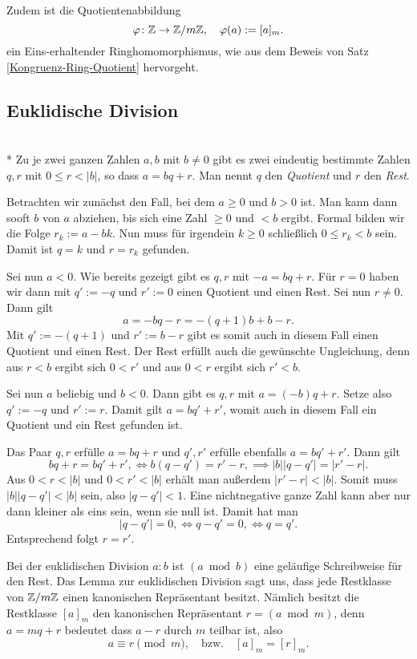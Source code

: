 \noindent
Zudem ist die Quotientenabbildung
\[\varphi\colon\mathbb Z \to \mathbb Z/m\mathbb Z,\quad \varphi(a):=[a]_m.\]
ein Eins-erhaltender Ringhomomorphismus, wie aus dem Beweis
von Satz \ref{Kongruenz-Ring-Quotient} hervorgeht.

\subsection{Euklidische Division}

\begin{Satz}\mbox{}\\*
Zu je zwei ganzen Zahlen $a,b$ mit $b\ne 0$ gibt es zwei eindeutig
bestimmte Zahlen $q,r$ mit $0\le r<|b|$, so dass $a=bq+r$. Man nennt
$q$ den \emph{Quotient} und $r$ den \emph{Rest}.
\end{Satz}
\begin{Beweis}
Betrachten wir zunächst den Fall, bei dem $a\ge 0$
und $b>0$ ist. Man kann dann sooft $b$ von $a$ abziehen, bis sich eine
Zahl $\ge 0$ und $<b$ ergibt. Formal bilden wir die
Folge $r_k := a-bk$. Nun muss für irgendein $k\ge 0$ schließlich
$0\le r_k<b$ sein. Damit ist $q=k$ und $r=r_k$ gefunden.

Sei nun $a<0$. Wie bereits gezeigt gibt es $q,r$ mit $-a = bq+r$.
Für $r=0$ haben wir dann mit $q':=-q$ und $r':=0$ einen Quotient
und einen Rest. Sei nun $r\ne 0$. Dann gilt
\[a = -bq-r = -(q+1)b + b - r.\]
Mit $q':=-(q+1)$ und $r':=b-r$ gibt es somit auch in diesem Fall einen
Quotient und einen Rest. Der Rest erfüllt auch die gewünschte
Ungleichung, denn aus $r<b$ ergibt sich $0<r'$ und aus $0<r$ ergibt
sich $r'<b$.

Sei nun $a$ beliebig und $b<0$. Dann gibt es $q,r$ mit $a=(-b)q+r$.
Setze also $q':=-q$ und $r':=r$. Damit gilt $a=bq'+r'$, womit
auch in diesem Fall ein Quotient und ein Rest gefunden ist.\,\qedsymbol
\end{Beweis}
\begin{Beweis}
Das Paar $q,r$ erfülle
$a=bq+r$ und $q',r'$ erfülle ebenfalls $a=bq'+r'$. Dann gilt
\[bq+r = bq'+r',\iff b(q-q') = r'-r,\implies |b| |q-q'| = |r'-r|.\]
Aus $0<r<|b|$ und $0<r'<|b|$ erhält man außerdem $|r'-r|<|b|$. Somit
muss $|b| |q-q'| < |b|$ sein, also $|q-q'| < 1$. Eine nichtnegative
ganze Zahl kann aber nur dann kleiner als eins sein, wenn sie null
ist. Damit hat man
\[|q-q'|=0,\iff q-q'=0,\iff q=q'.\]
Entsprechend folgt $r=r'$.\,\qedsymbol
\end{Beweis}

Bei der euklidischen Division $a:b$ ist $(a\bmod b)$ eine geläufige
Schreibweise für den Rest. Das Lemma zur euklidischen Division sagt uns,
dass jede Restklasse von $\mathbb Z/m\mathbb Z$ einen kanonischen Repräsentant
besitzt. Nämlich besitzt die Restklasse $[a]_m$ den kanonischen
Repräsentant $r=(a\bmod m)$, denn $a=mq+r$ bedeutet dass $a-r$ durch
$m$ teilbar ist, also
\[a\equiv r\pmod m,\quad\text{bzw.}\quad [a]_m = [r]_m.\]


